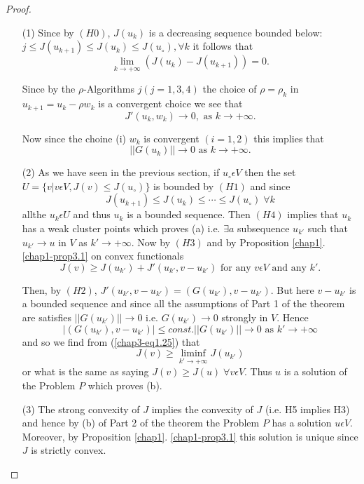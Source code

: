 \begin{proof}
\begin{enumerate}
\item[(1)] Since by $(H0)$, $J(u_{k})$ is a decreasing sequence bounded below: $j \leq J(u_{k+1}) \leq J(u_{k}) \leq J(u_{\circ}),  \forall k$ it follows that
$$
\lim_{k \to + \infty} (J(u_{k}) - J(u_{k+1})) = 0.
$$

Since by the $\rho$-Algorithms $j(j = 1, 3, 4)$ the choice of $\rho = \rho_{k}$ in $u_{k+1} = u_{k} - \rho w_{k}$ is a convergent choice we see that
$$
J'(u_{k}, w_{k}) \to 0, \text{ as } k \to + \infty.
$$

Now since the choine (i) $w_{k}$ is convergent $(i = 1, 2)$ this implies that
$$
||G(u_{k})|| \to 0 \text{ as } k \to + \infty.
$$

\item[(2)] As we have seen in the previous section, if $u_{\circ} \epsilon V$ then the set $U = \{v | v \epsilon V, J(v) \leq J(u_{\circ})\}$ is bounded by $(H1)$ and since
$$
J(u_{k+1}) \leq J(u_{k}) \leq \cdots \leq J(u_{\circ}) \; \forall k
$$
all\pageoriginale the $u_{k} \epsilon U$ and thus $u_{k}$ is a bounded sequence. Then $(H4)$ implies that $u_{k}$ has a weak cluster points which proves (a) i.e. $\exists a$ subsequence $u_{k'}$ such that $u_{k'} \to u$ in $V$ as $k' \to + \infty$. Now by $(H3)$ and by Proposition \ref{chap1}. \ref{chap1-prop3.1}  on convex functionals
\begin{equation*}
J(v) \geq J(u_{k'}) + J'(u_{k'}, v-u_{k'}) \text{ for any } v \epsilon V
 \text{ and any } k'.\tag{1.25}\label{chap3-eq1.25}
\end{equation*}

Then, by $(H2)$, $J'(u_{k'}, v-u_{k'}) = (G(u_{k'}), v-u_{k'})$. But here $v-u_{k'}$ is a bounded sequence and since all the assumptions of Part 1 of the theorem are satisfies $||G(u_{k'})|| \to 0$ i.e. $G(u_{k'}) \to 0$ strongly in $V$. Hence
$$
|(G(u_{k'}), v-u_{k'})| \leq const. ||G(u_{k'})|| \to 0 \text{ as } k' \to + \infty
$$
and so we find from (\ref{chap3-eq1.25}) that
$$
J(v) \geq \mathop{\lim \inf}_{k' \to + \infty} J(u_{k'})
$$
or what is the same as saying $J(v) \geq J(u) \; \forall v \epsilon V$. Thus $u$ is a solution of the Problem $P$ which proves (b).

\item[(3)] The strong convexity of $J$ implies the convexity of $J$ (i.e. H5 implies H3) and hence by (b) of Part 2 of the theorem the Problem $P$ has a solution $u \epsilon V$. Moreover, by Proposition \ref{chap1}. \ref{chap1-prop3.1} this solution is unique since $J$ is strictly convex.


\end{enumerate}
\end{proof}
